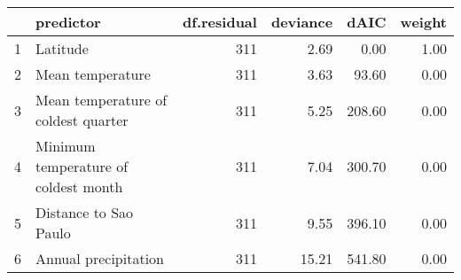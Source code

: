 \begin{table}[h]
\centering
\begin{tabular}{rlrrrr}
  \hline
 & predictor & df.residual & deviance & dAIC & weight \\ 
  \hline
1 & Latitude & 311 & 2.69 & 0.00 & 1.00 \\ 
  2 & Mean temperature & 311 & 3.63 & 93.60 & 0.00 \\ 
  3 & Mean temperature of coldest quarter & 311 & 5.25 & 208.60 & 0.00 \\ 
  4 & Minimum temperature of coldest month & 311 & 7.04 & 300.70 & 0.00 \\ 
  5 & Distance to Sao Paulo & 311 & 9.55 & 396.10 & 0.00 \\ 
  6 & Annual precipitation & 311 & 15.21 & 541.80 & 0.00 \\ 
   \hline
\end{tabular}
\end{table}
